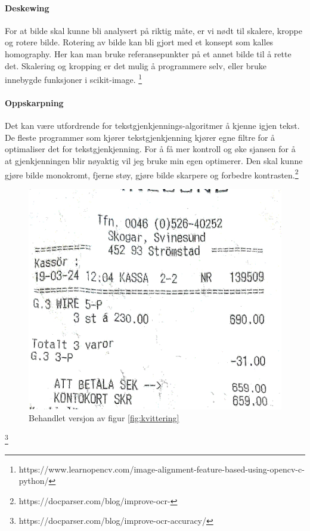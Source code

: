 \documentclass{article}
\begin{document}
\paragraph{Deskewing}
For at bilde skal kunne bli analysert på riktig måte, er vi nødt til skalere, kroppe og rotere bilde. Rotering av bilde kan bli gjort med et konsept som kalles homography. Her kan man bruke referansepunkter på et annet bilde til å rette det. Skalering og kropping er det mulig å programmere selv, eller bruke innebygde funksjoner i scikit-image. \footnote{https://www.learnopencv.com/image-alignment-feature-based-using-opencv-c-python/}
\paragraph{Oppskarpning}
Det kan være utfordrende for tekstgjenkjennings-algoritmer å kjenne igjen tekst. De fleste programmer som kjører tekstgjenkjenning kjører egne filtre for å optimaliser det for tekstgjenkjenning. For å få mer kontroll og øke sjansen for å at gjenkjenningen blir nøyaktig vil jeg bruke min egen optimerer. Den skal kunne gjøre bilde monokromt, fjerne støy, gjøre bilde skarpere og forbedre kontrasten.\footnote{https://docparser.com/blog/improve-ocr-}
\begin{figure}[h]
\centering
\includegraphics[scale=0.2]{images/test_image_threated.jpg}
\caption{Behandlet versjon av figur \ref{fig:kvittering}}
\label{fig:behandlet_kvittering}
\end{figure}
\footnote{https://docparser.com/blog/improve-ocr-accuracy/}
\end{document}
